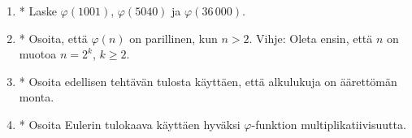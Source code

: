 \begin{enumerate}
\item * Laske $\varphi(1001)$, $\varphi(5040)$ ja $\varphi(36\,000)$.

\item * Osoita, että $\varphi(n)$ on parillinen, kun $n>2$. Vihje: Oleta ensin, että $n$ on muotoa $n=2^k$, $k\ge 2$. 

\item * Osoita edellisen tehtävän tulosta käyttäen, että alkulukuja on äärettömän monta.

\item * Osoita Eulerin tulokaava käyttäen hyväksi  $\varphi$-funktion multiplikatiivisuutta.





\end{enumerate}


